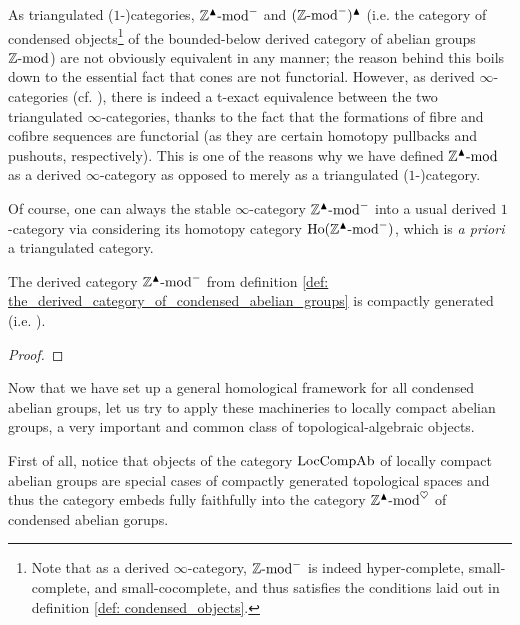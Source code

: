             \begin{remark} \label{remark: condensation_of_the_derived_category_of_abelian_groups}
                As triangulated ($1$-)categories, $\mathbb{Z}^{\blacktriangle}\text{-}\mathrm{mod}^-$ and $(\mathbb{Z}\text{-}\mathrm{mod}^-)^{\blacktriangle}$ (i.e. the category of condensed objects\footnote{Note that as a derived $\infty$-category, $\mathbb{Z}\text{-}\mathrm{mod}^-$ is indeed hyper-complete, small-complete, and small-cocomplete, and thus satisfies the conditions laid out in definition \ref{def: condensed_objects}.} of the bounded-below derived category of abelian groups $\mathbb{Z}\text{-}\mathrm{mod}$) are not obviously equivalent in any manner; the reason behind this boils down to the essential fact that cones are not functorial. However, as derived $\infty$-categories (cf. \cite[Subsection 1.3.2]{HA}), there is indeed a t-exact equivalence between the two triangulated $\infty$-categories, thanks to the fact that the formations of fibre and cofibre sequences are functorial (as they are certain homotopy pullbacks and pushouts, respectively). This is one of the reasons why we have defined $\mathbb{Z}^{\blacktriangle}\text{-}\mathrm{mod}$ as a derived $\infty$-category as opposed to merely as a triangulated ($1$-)category.
                
                Of course, one can always  the stable $\infty$-category $\mathbb{Z}^{\blacktriangle}\text{-}\mathrm{mod}^-$ into a usual derived $1$-category via considering its homotopy category $\mathrm{Ho}(\mathbb{Z}^{\blacktriangle}\text{-}\mathrm{mod}^-)$, which is \textit{a priori} a triangulated category. 
            \end{remark}
            \begin{proposition} \label{prop: the_derived_category_of_condensed_abelian_groups_is_compactly_generated}
                The derived category $\mathbb{Z}^{\blacktriangle}\text{-}\mathrm{mod}^-$ from definition \ref{def: the_derived_category_of_condensed_abelian_groups} is compactly generated (i.e. ).
            \end{proposition}
                \begin{proof}
                    
                \end{proof}
                
            Now that we have set up a general homological framework for all condensed abelian groups, let us try to apply these machineries to locally compact abelian groups, a very important and common class of topological-algebraic objects. 
            \begin{remark}
                First of all, notice that objects of the category $\mathrm{Loc}\mathrm{Comp}\mathrm{Ab}$ of locally compact abelian groups are special cases of compactly generated topological spaces and thus the category embeds fully faithfully into the category $\mathbb{Z}^{\blacktriangle}\text{-}\mathrm{mod}^{\heartsuit}$ of condensed abelian gorups. 
            \end{remark}
            \begin{remark} \label{remark: the_category_of_locally_compact_abelian_groups_is_monoidally_closed}
                
            \end{remark}
                
